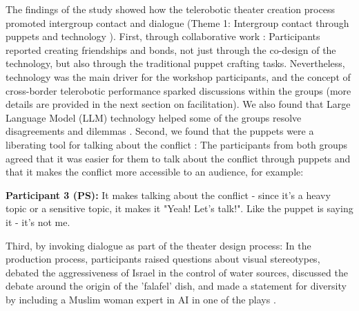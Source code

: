 \documentclass[dissertation,math,vertlayout,pdfa,colorlinks,nologo]{aaltoseries}
\begin{document}
The findings of the study showed how the telerobotic theater creation process promoted intergroup contact and dialogue (Theme 1: Intergroup contact through puppets and technology \cite[p. 14]{peledTeleroboticTheaterOppressed2025}). First, through collaborative work \cite[p. 14]{peledTeleroboticTheaterOppressed2025}: Participants reported creating friendships and bonds, not just through the co-design of the technology, but also through the traditional puppet crafting tasks. Nevertheless, technology was the main driver for the workshop participants, and the concept of cross-border telerobotic performance sparked discussions within the groups (more details are provided in the next section on facilitation). We also found that Large Language Model (LLM) technology helped some of the groups resolve disagreements and dilemmas \cite[p. 22]{peledTeleroboticTheaterOppressed2025}. Second, we found that the puppets were a liberating tool for talking about the conflict \cite[p. 13]{peledTeleroboticTheaterOppressed2025}: The participants from both groups agreed that it was easier for them to talk about the conflict through puppets and that it makes the conflict more accessible to an audience, for example:
\begin{displayquote}
    \textbf{Participant 3 (PS):} It makes talking about the conflict - since it's a heavy topic or a sensitive topic, it makes it "Yeah! Let's talk!". Like the puppet is saying it -  it's not me.
\end{displayquote}
Third, by invoking dialogue as part of the theater design process: In the production process, participants raised questions about visual stereotypes, debated the aggressiveness of Israel in the control of water sources, discussed the debate around the origin of the 'falafel' dish, and made a statement for diversity by including a Muslim woman expert in AI in one of the plays \cite[p. 14]{peledTeleroboticTheaterOppressed2025}.
\end{document}
